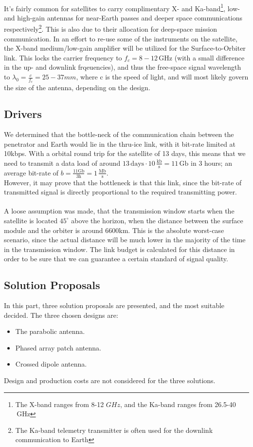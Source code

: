 \\
It's fairly common for satellites to carry complimentary X- and Ka-band\footnote{The X-band ranges from 8-12 $GHz$, and the Ka-band ranges from 26.5-40$\,\mathrm{GHz}$}, low- and high-gain antennas for near-Earth passes and deeper space communications respectively\footnote{The Ka-band telemetry transmitter is often used for the downlink communication to Earth}. This is also due to their allocation for deep-space mission communication. In an effort to re-use some of the instruments on the satellite, the X-band medium/low-gain amplifier will be utilized for the Surface-to-Orbiter link. This locks the carrier frequency to $f_c=8-12\,\mathrm{GHz}$ (with a small difference in the up- and downlink frqeuencies), and thus the free-space signal wavelength to $\lambda_0=\frac{c}{f_c}=25-37mm$, where c is the speed of light, and will most likely govern the size of the antenna, depending on the design.
\subsection{Drivers}
We determined that the bottle-neck of the communication chain between the penetrator and Earth would lie in the thru-ice link, with it bit-rate limited at 10kbps. With a orbital round trip for the satellite of 13 days, this means that we need to transmit a data load of around $13\,\mathrm{days}\cdot 10\, \mathrm{\frac{kb}{s}}=11\,\mathrm{Gb}$ in 3 hours; an average bit-rate of $b=\frac{11\mathrm{Gb}}{3\mathrm{h}}=1\,\mathrm{\frac{Mb}{s}}$.\\
However, it may prove that the bottleneck is that this link, since the bit-rate of transmitted signal is directly proportional to the required transmitting power.\\
\\
A loose assumption was made, that the transmission window starts when the satellite is located $45^\circ$ above the horizon, when the distance between the surface module and the orbiter is around 6600km. This is the absolute worst-case scenario, since the actual distance will be much lower in the majority of the time in the transmission window. The link budget is calculated for this distance in order to be sure that we can guarantee a certain standard of signal quality.
\subsection{Solution Proposals}
In this part, three solution proposals are presented, and the most suitable decided. The three chosen designs are:
\begin{itemize}
\item The parabolic antenna.
\item Phased array patch antenna.
\item Crossed dipole antenna. 
\end{itemize}
Design and production costs are not considered for the three solutions. 
